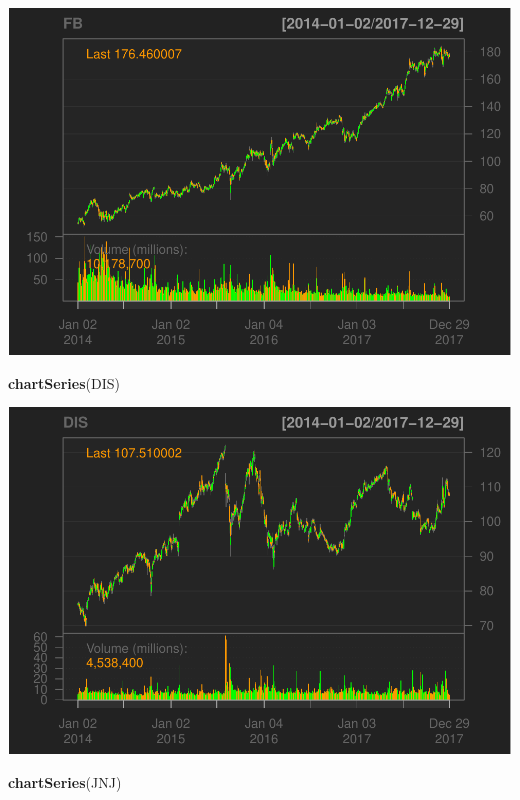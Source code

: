 \documentclass[]{article}
\newenvironment{Shaded}{\begin{snugshade}}{\end{snugshade}}
\newcommand{\KeywordTok}[1]{\textcolor[rgb]{0.13,0.29,0.53}{\textbf{#1}}}
\newcommand{\NormalTok}[1]{#1}
\begin{document}
\includegraphics{Markowitz_Research_Me_files/figure-latex/unnamed-chunk-4-2.pdf}

\begin{Shaded}
\begin{Highlighting}[]
\KeywordTok{chartSeries}\NormalTok{(DIS)}
\end{Highlighting}
\end{Shaded}

\includegraphics{Markowitz_Research_Me_files/figure-latex/unnamed-chunk-4-3.pdf}

\begin{Shaded}
\begin{Highlighting}[]
\KeywordTok{chartSeries}\NormalTok{(JNJ)}
\end{Highlighting}
\end{Shaded}
\end{document}
